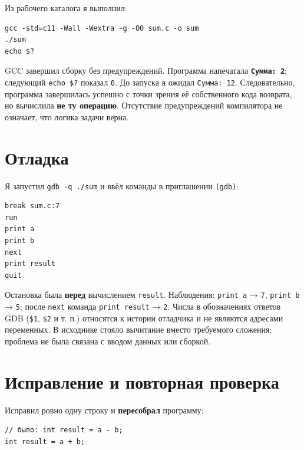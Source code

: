 Из рабочего каталога я выполнил:

\begin{verbatim}
gcc -std=c11 -Wall -Wextra -g -O0 sum.c -o sum
./sum
echo $?
\end{verbatim}

GCC завершил сборку без предупреждений. Программа напечатала
\textbf{\texttt{Сумма:\ 2}}; следующий \texttt{echo\ \$?} показал
\texttt{0}. До запуска я ожидал \texttt{Сумма:\ 12}. Следовательно,
программа завершилась успешно с точки зрения её собственного кода
возврата, но вычислила \textbf{не ту операцию}. Отсутствие
предупреждений компилятора не означает, что логика задачи верна.

\hypertarget{ux43eux442ux43bux430ux434ux43aux430}{%
\section{Отладка}\label{ux43eux442ux43bux430ux434ux43aux430}}

Я запустил \texttt{gdb\ -q\ ./sum} и ввёл команды в приглашении
\texttt{(gdb)}:

\begin{verbatim}
break sum.c:7
run
print a
print b
next
print result
quit
\end{verbatim}

Остановка была \textbf{перед} вычислением \texttt{result}. Наблюдения:
\texttt{print\ a} → \texttt{7}, \texttt{print\ b} → \texttt{5}; после
\texttt{next} команда \texttt{print\ result} → \texttt{2}. Числа в
обозначениях ответов GDB (\texttt{\$1}, \texttt{\$2} и т. п.) относятся
к истории отладчика и не являются адресами переменных. В исходнике
стояло вычитание вместо требуемого сложения; проблема не была связана с
вводом данных или сборкой.

\hypertarget{ux438ux441ux43fux440ux430ux432ux43bux435ux43dux438ux435-ux438-ux43fux43eux432ux442ux43eux440ux43dux430ux44f-ux43fux440ux43eux432ux435ux440ux43aux430}{%
\section{Исправление и повторная
проверка}\label{ux438ux441ux43fux440ux430ux432ux43bux435ux43dux438ux435-ux438-ux43fux43eux432ux442ux43eux440ux43dux430ux44f-ux43fux440ux43eux432ux435ux440ux43aux430}}

Исправил ровно одну строку и \textbf{пересобрал} программу:

\begin{verbatim}
// было: int result = a - b;
int result = a + b;
\end{verbatim}

